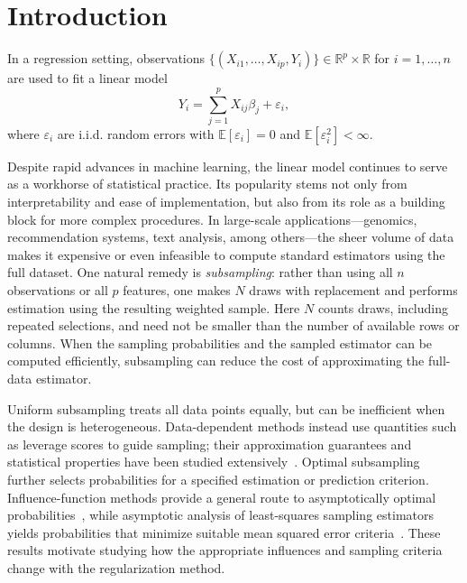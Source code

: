 \documentclass[pdflatex,iicol,sn-mathphys-ay]{sn-jnl}
\theoremstyle{thmstyleone}
\theoremstyle{thmstylethree}
\theoremstyle{thmstyletwo}
\begin{document}
\section{Introduction}
\label{sec:introduction}

In a regression setting, observations $\{(X_{i1}, \ldots, X_{ip}, Y_i)\} \in \mathbb{R}^p \times \mathbb{R}$ for $i = 1, \ldots, n$ are used to fit a linear model
\begin{equation*}
    Y_i = \sum_{j=1}^{p} X_{ij}\beta_j + \varepsilon_i,
\end{equation*}
where $\varepsilon_i$ are i.i.d. random errors with
$\mathbb{E}[\varepsilon_i] = 0$ and $\mathbb{E}[\varepsilon_i^2] < \infty$.

Despite rapid advances in machine learning, the linear model continues to serve as a workhorse of statistical practice. Its popularity stems not only from interpretability and ease of implementation, but also from its role as a building block for more complex procedures. In large-scale applications---genomics, recommendation systems, text analysis, among others---the sheer volume of data makes it expensive or even infeasible to compute standard estimators using the full dataset. One natural remedy is \emph{subsampling}: rather than using all $n$ observations or all $p$ features, one makes $N$ draws with replacement and performs estimation using the resulting weighted sample. Here $N$ counts draws, including repeated selections, and need not be smaller than the number of available rows or columns. When the sampling probabilities and the sampled estimator can be computed efficiently, subsampling can reduce the cost of approximating the full-data estimator.

Uniform subsampling treats all data points equally, but can be inefficient when the design is heterogeneous. Data-dependent methods instead use quantities such as leverage scores to guide sampling; their approximation guarantees and statistical properties have been studied extensively~\citep{drineas2006sampling,ma2015statistical}. Optimal subsampling further selects probabilities for a specified estimation or prediction criterion. Influence-function methods provide a general route to asymptotically optimal probabilities~\citep{ting2018optimal}, while asymptotic analysis of least-squares sampling estimators yields probabilities that minimize suitable mean squared error criteria~\citep{ma2022asymptotic}. These results motivate studying how the appropriate influences and sampling criteria change with the regularization method.
\end{document}
